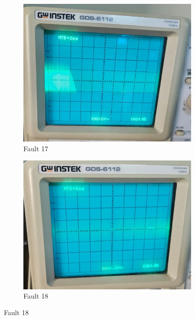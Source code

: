 \documentclass[a4paper,12pt]{article}
\begin{document}
\begin{figure}[H]
	\centering
	
	\begin{subfigure}[t]{0.44\textwidth}
		\centering
		\includegraphics[width=1\linewidth]{Images/1.17}
		\caption{Fault 17}
		\vspace{0.1cm}
	\end{subfigure}
	\hfil
	\begin{subfigure}[t]{0.44\textwidth}
		\centering
		\includegraphics[width=1\linewidth]{Images/1.18}
		\caption{Fault 18}
		\vspace{0.1cm}
	\end{subfigure}
	

\end{figure}
\end{document}
